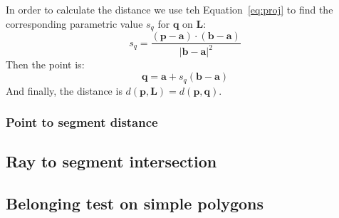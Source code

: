 In order to calculate the distance we use teh Equation~\ref{eq:proj} to find the corresponding parametric value $s_q$ for $\mathbf{q}$ on $\mathbf{L}$: 
\begin{equation}
s_q = \dfrac{(\mathbf{p} - \mathbf{a}) \cdot (\mathbf{b} - \mathbf{a})}{|\mathbf{b} - \mathbf{a}|^2}
\label{eq:scalarq}
\end{equation}
Then the point is:
\begin{equation}
\mathbf{q} = \mathbf{a} + s_q (\mathbf{b} -\mathbf{a})
\label{eq:pointq}
\end{equation}
And finally, the distance is $d(\mathbf{p}, \mathbf{L}) = d(\mathbf{p}, \mathbf{q})$.
\subsubsection{Point to segment distance}
\subsection{Ray to segment intersection}
\subsection{Belonging test on simple polygons}

